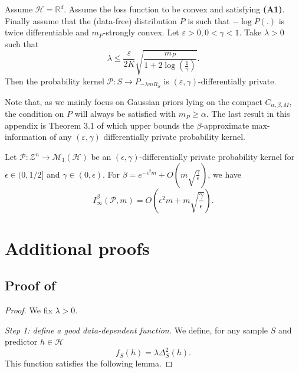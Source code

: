 \begin{noaddcontents}
\begin{proposition}
\label{prop: minami}
Assume $\mathcal{H}=\mathbb{R}^d$. Assume the loss function to be convex and satisfying \textbf{(A1)}. Finally assume that the (data-free) distribution $P$ is such that $-\log P(.)$ is twice differentiable and $m_P$-strongly convex.
Let $\varepsilon>0, 0<\gamma<1$. Take $\lambda>0$ such that
\[ \lambda \leq \frac{\varepsilon}{2K}\sqrt{\frac{m_P}{1+ 2 \log\left( \frac{1}{\gamma}  \right)}}.  \]
Then the probability kernel $\mathcal{P} : S \rightarrow P_{-\lambda m R_S}$ is $(\varepsilon,\gamma)$-differentially private.
\end{proposition}
Note that, as we mainly focus on Gaussian priors lying on the compact $C_{\alpha,\beta,M}$, the condition on $P$ will always be satisfied with $m_P\geq \alpha$. The last result in this appendix is Theorem 3.1 of \citet{rogers2016max} which upper bounds the $\beta$-approximate max-information of any $(\varepsilon,\gamma)$ differentially private probability kernel.

\begin{proposition}
\label{prop: rogers}
Let $\mathcal{P}: \mathcal{Z}^n \rightarrow \mathcal{M}_1(\mathcal{H})$ be an $(\epsilon, \gamma)$-differentially private probability kernel for $\epsilon \in(0,1 / 2]$ and $\gamma \in(0, \epsilon)$.
For $\beta=e^{-\epsilon^2 m}+O\left(m \sqrt{\frac{\gamma}{\epsilon}}\right)$, we have
$$
I_{\infty}^\beta(\mathcal{P}, m)=O\left(\epsilon^2 m + m \sqrt{\frac{\gamma}{\epsilon}}\right) .
$$
\end{proposition}



 
\section{Additional proofs}
\label{sec: proofs_chap_5}
\subsection{Proof of }
\label{sec: proof_compact_mcall}

\begin{proof}
We fix $\lambda>0$.

\textit{Step 1: define a good data-dependent function.} We define, for any sample $S$ and predictor $h\in \mathcal{H}$
\[ f_S(h) = \lambda \Delta_S^2(h). \]
This function satisfies the following lemma.


\end{proof}
\end{noaddcontents}
